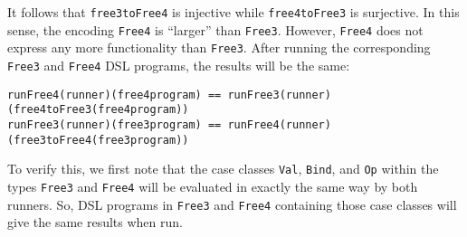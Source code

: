 It follows that \lstinline!free3toFree4!
is injective while \lstinline!free4toFree3!
is surjective. In this sense, the encoding \lstinline!Free4!
is \textsf{``}larger\textsf{''} than \lstinline!Free3!.
However, \lstinline!Free4!
does not express any more functionality than \lstinline!Free3!.
After running the corresponding \lstinline!Free3!
and \lstinline!Free4! DSL
programs, the results will be the same:
\begin{lstlisting}
runFree4(runner)(free4program) == runFree3(runner)(free4toFree3(free4program))
runFree3(runner)(free3program) == runFree4(runner)(free3toFree4(free3program))
\end{lstlisting}
To verify this, we first note that the case classes \lstinline!Val!,
\lstinline!Bind!, and \lstinline!Op!
within the types \lstinline!Free3!
and \lstinline!Free4! will
be evaluated in exactly the same way by both runners. So, DSL programs
in \lstinline!Free3! and
\lstinline!Free4! containing
those case classes will give the same results when run.

